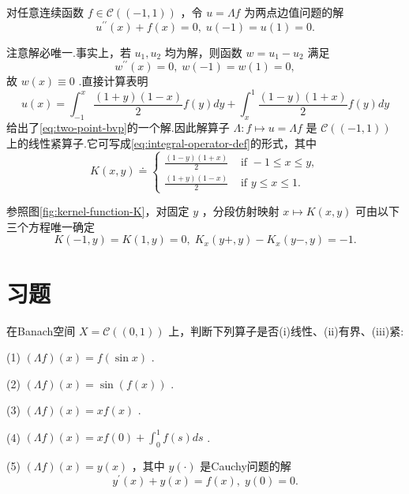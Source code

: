 \begin{instance}\label{ins:two-point-bvp-compact}
对任意连续函数 $f \in  \mathcal{C}\left( \left(  {-1,1}\right)  \right)$ ，令 $u = {\Lambda f}$ 为两点边值问题的解
\begin{equation}\tag{4.10}\label{eq:two-point-bvp}
{u}^{\prime \prime }\left( x\right)  + f\left( x\right)  = 0,\;u\left( {-1}\right)  = u\left( 1\right)  = 0.
\end{equation}

注意解必唯一.事实上，若 ${u}_{1},{u}_{2}$ 均为解，则函数 $w = {u}_{1} - {u}_{2}$ 满足
\[
{w}^{\prime \prime }\left( x\right)  = 0,\;w\left( {-1}\right)  = w\left( 1\right)  = 0,
\]
故 $w\left( x\right)  \equiv  0$ .直接计算表明
\[
u\left( x\right)  = {\int }_{-1}^{x}\frac{\left( {1 + y}\right) \left( {1 - x}\right) }{2}f\left( y\right) {dy} + {\int }_{x}^{1}\frac{\left( {1 - y}\right) \left( {1 + x}\right) }{2}f\left( y\right) {dy}
\]
给出了\eqref{eq:two-point-bvp}的一个解.因此解算子 $\Lambda  : f \mapsto  u = {\Lambda f}$ 是 $\mathcal{C}\left( \left(  {-1,1}\right)  \right)$ 上的线性紧算子.它可写成\eqref{eq:integral-operator-def}的形式，其中
\begin{equation}\tag{4.11}\label{eq:green-kernel}
K\left( {x,y}\right)  \doteq \begin{cases}\frac{\left( {1 - y}\right) \left( {1 + x}\right) }{2} & \text{ if } - 1 \leq  x \leq  y, \\[5pt]  \frac{\left( {1 + y}\right) \left( {1 - x}\right) }{2} & \text{ if }y \leq  x \leq  1. \end{cases}
\end{equation}

参照图\ref{fig:kernel-function-K}，对固定 $y$ ，分段仿射映射 $x \mapsto  K\left( {x,y}\right)$ 可由以下三个方程唯一确定
\[
K\left( {-1,y}\right)  = K\left( {1,y}\right)  = 0,\;{K}_{x}\left( {y+,y}\right)  - {K}_{x}\left( {y-,y}\right)  =  - 1.
\]
\end{instance}

\section{习题}

\begin{rbhw}[index=1]
在Banach空间 $X = \mathcal{C}\left( \left(  {0,1}\right)  \right)$ 上，判断下列算子是否(i)线性、(ii)有界、(iii)紧:

(1) $\left( {\Lambda f}\right) \left( x\right)  = f\left( {\sin x}\right)$ .

(2) $\left( {\Lambda f}\right) \left( x\right)  = \sin \left( {f\left( x\right) }\right)$ .

(3) $\left( {\Lambda f}\right) \left( x\right)  = {xf}\left( x\right)$ .

(4) $\left( {\Lambda f}\right) \left( x\right)  = {xf}\left( 0\right)  + {\int }_{0}^{1}f\left( s\right) {ds}$ .

(5) $\left( {\Lambda f}\right) \left( x\right)  = y\left( x\right)$ ，其中 $y\left( \cdot \right)$ 是Cauchy问题的解
\[
{y}^{\prime }\left( x\right)  + y\left( x\right)  = f\left( x\right) ,\;y\left( 0\right)  = 0.
\]
\end{rbhw}


